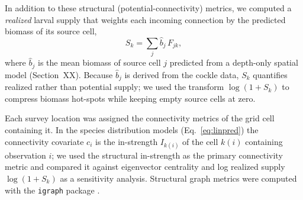 In addition to these structural (potential-connectivity) metrics, we computed a
\emph{realized} larval supply that weights each incoming connection by the
predicted biomass of its source cell,
\begin{equation}
S_k = \sum_{j} \hat{b}_j\, F_{jk},
\end{equation}
where $\hat{b}_j$ is the mean biomass of source cell $j$ predicted from a
depth-only spatial model (Section~XX). Because $\hat{b}_j$ is derived from the
cockle data, $S_k$ quantifies realized rather than potential supply; we used the
transform $\log(1+S_k)$ to compress biomass hot-spots while keeping empty source
cells at zero.

Each survey location was assigned the connectivity metrics of the grid cell
containing it. In the species distribution models
(Eq.~\ref{eq:linpred}) the connectivity covariate $c_i$ is the in-strength
$I_{k(i)}$ of the cell $k(i)$ containing observation $i$; we used the structural
in-strength as the primary connectivity metric and compared it against
eigenvector centrality and log realized supply $\log(1+S_k)$ as a sensitivity
analysis. Structural graph metrics were computed with the \texttt{igraph}
package \citep{csardi2006}.
